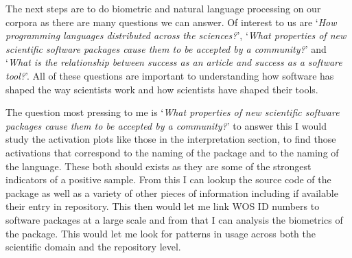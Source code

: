 \documentclass[12pt, a4paper]{article}
\begin{document}
The next steps are to do biometric and natural language processing on our corpora as there are many questions we can answer. Of interest to us are `\textit{How programming languages distributed across the sciences?}', `\textit{What properties of new scientific software packages cause them to be accepted by a community?}' and `\textit{What is the relationship between success as an article and success as a software tool?}'. All of these questions are important to understanding how software has shaped the way scientists work and how scientists have shaped their tools.

The question most pressing to me is `\textit{What properties of new scientific software packages cause them to be accepted by a community?}' to answer this I would study the activation plots like those in the interpretation section, to find those activations that correspond to the naming of the package and to the naming of the language. These both should exists as they are some of the strongest indicators of a positive sample. From this I can lookup the source code of the package as well as a variety of other pieces of information including if available their entry in repository. This then would let me link WOS ID numbers to software packages at a large scale and from that I can analysis the biometrics of the package. This would let me look for patterns in usage across both the scientific domain and the repository level.


\newpage
{}
%

\end{document}
